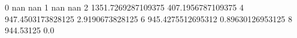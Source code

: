 0 nan nan
1 nan nan
2 1351.7269287109375 407.1956787109375
4 947.4503173828125 2.9190673828125
6 945.4275512695312 0.89630126953125
8 944.53125 0.0
